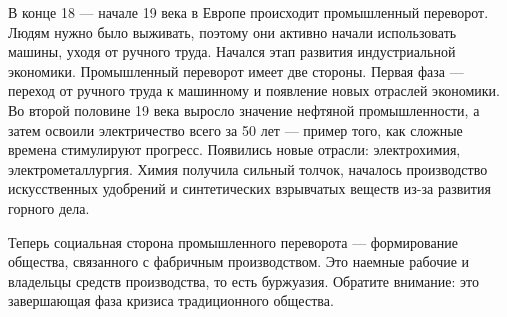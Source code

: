 В конце 18 --- начале 19 века в Европе происходит промышленный переворот. Людям нужно было выживать, поэтому они активно начали использовать машины, уходя от ручного труда. Начался этап развития индустриальной экономики. Промышленный переворот имеет две стороны. Первая фаза --- переход от ручного труда к машинному и появление новых отраслей экономики. Во второй половине 19 века выросло значение нефтяной промышленности, а затем освоили электричество всего за 50 лет --- пример того, как сложные времена стимулируют прогресс.
Появились новые отрасли: электрохимия, электрометаллургия. Химия получила сильный толчок, началось производство искусственных удобрений и синтетических взрывчатых веществ из-за развития горного дела.

Теперь социальная сторона промышленного переворота --- формирование общества, связанного с фабричным производством. Это наемные рабочие и владельцы средств производства, то есть буржуазия. Обратите внимание: это завершающая фаза кризиса традиционного общества.

